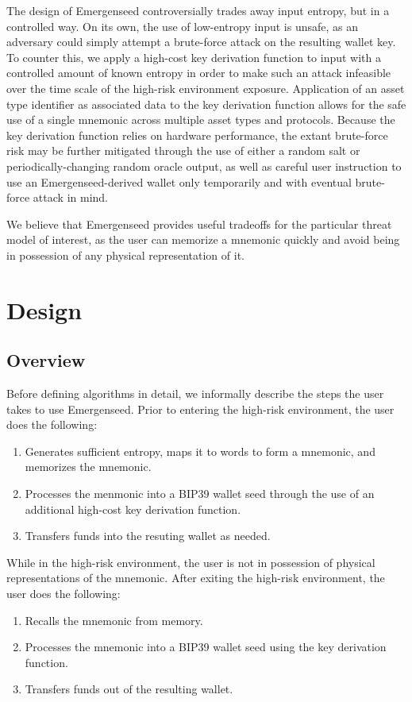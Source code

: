 \documentclass{article}
\begin{document}
The design of Emergenseed controversially trades away input entropy, but in a controlled way.
On its own, the use of low-entropy input is unsafe, as an adversary could simply attempt a brute-force attack on the resulting wallet key.
To counter this, we apply a high-cost key derivation function to input with a controlled amount of known entropy in order to make such an attack infeasible over the time scale of the high-risk environment exposure.
Application of an asset type identifier as associated data to the key derivation function allows for the safe use of a single mnemonic across multiple asset types and protocols.
Because the key derivation function relies on hardware performance, the extant brute-force risk may be further mitigated through the use of either a random salt or periodically-changing random oracle output, as well as careful user instruction to use an Emergenseed-derived wallet only temporarily and with eventual brute-force attack in mind.

We believe that Emergenseed provides useful tradeoffs for the particular threat model of interest, as the user can memorize a mnemonic quickly and avoid being in possession of any physical representation of it.


\section{Design}

\subsection{Overview}

Before defining algorithms in detail, we informally describe the steps the user takes to use Emergenseed.
Prior to entering the high-risk environment, the user does the following:
\begin{enumerate}
	\item Generates sufficient entropy, maps it to words to form a mnemonic, and memorizes the mnemonic.
	\item Processes the menmonic into a BIP39 wallet seed through the use of an additional high-cost key derivation function.
	\item Transfers funds into the resuting wallet as needed.
\end{enumerate}
While in the high-risk environment, the user is not in possession of physical representations of the mnemonic.
After exiting the high-risk environment, the user does the following:
\begin{enumerate}
	\item Recalls the mnemonic from memory.
	\item Processes the mnemonic into a BIP39 wallet seed using the key derivation function.
	\item Transfers funds out of the resulting wallet.
\end{enumerate}
\end{document}
